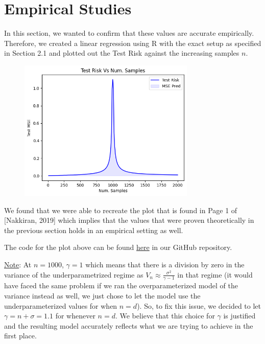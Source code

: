 \documentclass{article}
\begin{document}
\section{Empirical Studies}

In this section, we wanted to confirm that these values are accurate empirically. Therefore, we created a linear regression using R with the exact setup as specified in Section 2.1 and plotted out the Test Risk against the increasing samples $n$. 

\begin{figure}[h!]
  \centering
  \includegraphics[width=0.75\textwidth, quiet]{graph.png}
\end{figure}

We found that we were able to recreate the plot that is found in Page 1 of [Nakkiran, 2019] which implies that the values that were proven theoretically in the previous section holds in an empirical setting as well.

The code for the plot above can be found \href{https://github.com/ShawnGeorge03/STAD80-Final-Paper/tree/main}{here} in our GitHub repository.

\underline{Note}: At $n=1000$, $\gamma = 1$ which means that there is a division by zero in the variance of the underparametrized regime as $V_n \approx \frac{\sigma^2}{\gamma - 1}$ in that regime (it would have faced the same problem if we ran the overparameterized model of the variance instead as well, we just chose to let the model use the underparameterized values for when $n=d$). So, to fix this issue, we decided to let $\gamma = n + \sigma = 1.1$ for whenever $n=d$. We believe that this choice for $\gamma$ is justified and the resulting model accurately reflects what we are trying to achieve in the first place.
\end{document}
